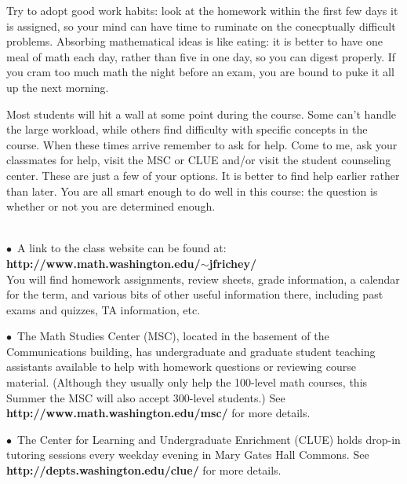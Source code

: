 \documentclass[11 pt]{report}
\begin{document}
\vspace{.2cm}

\noindent Try to adopt good work habits: look at
the homework within the first few days it is assigned, so your mind can have time to ruminate on the conecptually difficult problems.
Absorbing mathematical ideas is like eating: it is better to have one meal of math each day, rather than five in one day, so you can digest properly. If you cram too much math the night before an exam, you are bound to puke it all up the next morning.  

\vspace{.25cm}  

 Most students will hit a wall at some point
during the course.  Some can't handle the large workload, while
others find difficulty with specific concepts in the course. When
these times arrive remember to ask for help.  Come to me, ask your classmates for help, visit the MSC
or CLUE and/or visit the student counseling center.  These are just a
few of your options. It is better to find help earlier rather
than later. You are all smart enough to do well in this course: the
question is whether or not you are determined enough.
\vspace{0.3cm}

 \\
\noindent $\bullet$\ A link to the class website can be
found at: {\bf http://www.math.washington.edu/$\sim$jfrichey/} \\ You
will find homework assignments, review sheets, grade information, a
calendar for the term, and various bits of other useful information
there, including past exams and quizzes, TA information, etc.

\vspace{.2cm}

\noindent $\bullet$\ The Math Studies Center (MSC), located in the basement of the Communications building, has undergraduate and graduate student teaching assistants available to help with homework questions or reviewing course material. (Although they usually only help the 100-level math courses, this Summer the MSC will also accept 300-level students.) See {\bf http://www.math.washington.edu/msc/} for more details. 

\vspace{.2cm}

\noindent $\bullet$\ The Center for Learning and Undergraduate
Enrichment (CLUE) holds drop-in tutoring sessions every weekday
evening in Mary Gates Hall Commons.  See {\bf http://depts.washington.edu/clue/} for more details.
\end{document}
